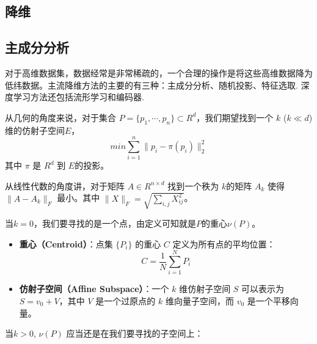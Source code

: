 \documentclass[lang=cn,newtx,10pt,scheme=chinese,chinesefont=nofont,citestyle=gb7714-2015, bibstyle=gb7714-2015]{elegantbook}
\begin{document}
\begin{refsection}
\chapter{降维}
\section{主成分分析}
对于高维数据集，数据经常是非常稀疏的，一个合理的操作是将这些高维数据降为低纬数据。主流降维方法的主要的有三种：主成分分析、随机投影、特征选取. 深度学习方法还包括流形学习和编码器.




从几何的角度来说，对于集合 $P=\{p_{1},\cdots, p_{n}\}\subset R^{d}$，我们期望找到一个 $k$ ($k\ll d$)维的仿射子空间$E$，
\begin{equation*}
    min\sum_{i=1}^{n} \|p_{i}-\pi(p_{i})\|_{2}^{2}
\end{equation*}
其中 $\pi$ 是 $R^d$ 到 $E$的投影。%

从线性代数的角度讲，对于矩阵 $A\in R^{n\times d}$ 找到一个秩为 $k$的矩阵 $A_{k}$ 使得 $\|A-A_{k}\|_{F}$ 最小。其中 $\|X\|_{F}=\sqrt{\sum_{i,j}X_{ij}^{2}}$。 

当$k=0$，我们要寻找的是一个点，由定义可知就是$P$的重心$\nu(P)$。


\begin{definition}
    \begin{itemize}
    \item \textbf{重心（Centroid）}：点集 $\{P_i\}$ 的重心 $C$ 定义为所有点的平均位置：
    \[
    C = \frac{1}{N} \sum_{i=1}^{N} P_i
    \]
    \item \textbf{仿射子空间（Affine Subspace）}：一个 $k$ 维仿射子空间 $S$ 可以表示为 $S = v_0 + V$，其中 $V$ 是一个过原点的 $k$ 维向量子空间，而 $v_0$ 是一个平移向量。
\end{itemize}
\end{definition}


当$k>0$, $\nu(P)$ 应当还是在我们要寻找的子空间上：


\end{refsection}
\end{document}
